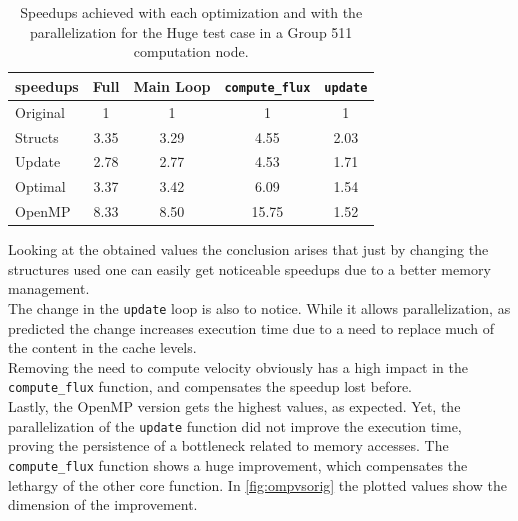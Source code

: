 \documentclass[9pt,twocolumn]{scrartcl}
\begin{document}
\begin{table}[!htp]
	\begin{center}
		\begin{tabular}{|l|cccc|}
\hline
speedups & Full & Main Loop & \texttt{compute\_flux} & \texttt{update}	\\
\hline
Original & 1 & 1 & 1 & 1	\\
Structs & 3.35 & 3.29 & 4.55 & 2.03	\\
Update & 2.78 & 2.77 & 4.53 & 1.71	\\
Optimal & 3.37 & 3.42 & 6.09 & 1.54	\\
OpenMP & 8.33 & 8.50 & 15.75 & 1.52	\\
\hline
		\end{tabular}
	\end{center}
	\caption{Speedups achieved with each optimization and with the parallelization for the Huge test case in a Group 511 computation node.}
	\label{tab:speedups}
\end{table}

Looking at the obtained values the conclusion arises that just by changing the structures used one can easily get noticeable speedups due to a better memory management.\\

The change in the \texttt{update} loop is also to notice. While it allows parallelization, as predicted the change increases execution time due to a need to replace much of the content in the cache levels.\\

Removing the need to compute velocity obviously has a high impact in the \texttt{compute\_flux} function, and compensates the speedup lost before.\\

Lastly, the OpenMP version gets the highest values, as expected. Yet, the parallelization of the \texttt{update} function did not improve the execution time, proving the persistence of a bottleneck related to memory accesses. The \texttt{compute\_flux} function shows a huge improvement, which compensates the lethargy of the other core function. In \autoref{fig:ompvsorig} the plotted values show the dimension of the improvement.\\
\end{document}
